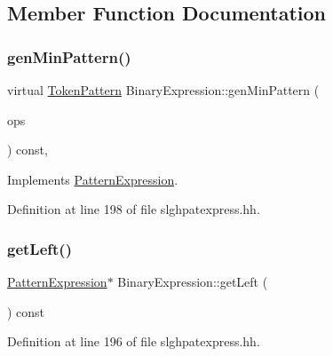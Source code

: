 \subsection{Member Function Documentation}
\mbox{\label{class_binary_expression_a840abb5f9741368ab019495a2b4c5dbf}} 
\subsubsection{\texorpdfstring{genMinPattern()}{genMinPattern()}}
{\footnotesize\ttfamily virtual \mbox{\hyperlink{class_token_pattern}{Token\+Pattern}} Binary\+Expression\+::gen\+Min\+Pattern (\begin{DoxyParamCaption}\item[{const vector$<$ \mbox{\hyperlink{class_token_pattern}{Token\+Pattern}} $>$ \&}]{ops }\end{DoxyParamCaption}) const\hspace{0.3cm}{\ttfamily [inline]}, {\ttfamily [virtual]}}



Implements \mbox{\hyperlink{class_pattern_expression_a1dc2d0c07f64fdab9da6c0849e992b50}{Pattern\+Expression}}.



Definition at line 198 of file slghpatexpress.\+hh.

\mbox{\label{class_binary_expression_abae7e8c5cbaa1158cc82f622fc9d54d4}} 
\subsubsection{\texorpdfstring{getLeft()}{getLeft()}}
{\footnotesize\ttfamily \mbox{\hyperlink{class_pattern_expression}{Pattern\+Expression}}$\ast$ Binary\+Expression\+::get\+Left (\begin{DoxyParamCaption}\item[{void}]{ }\end{DoxyParamCaption}) const\hspace{0.3cm}{\ttfamily [inline]}}



Definition at line 196 of file slghpatexpress.\+hh.

